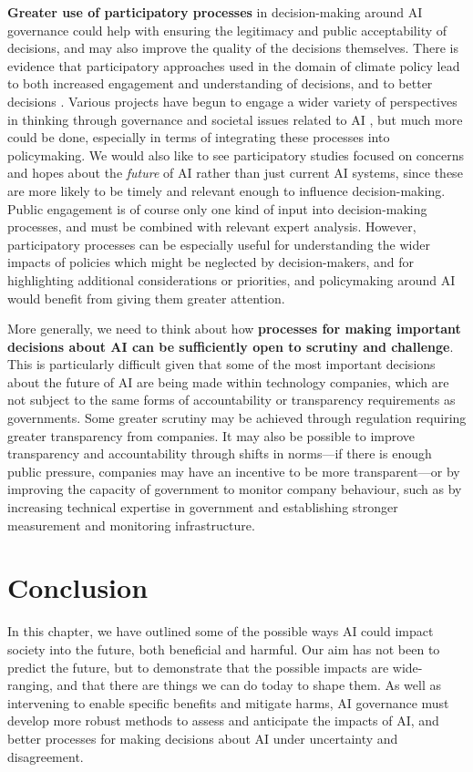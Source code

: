 \documentclass{article}
\begin{document}
\textbf{Greater use of participatory processes} in decision-making around AI governance could help with ensuring the legitimacy and public acceptability of decisions, and may also improve the quality of the decisions themselves. There is evidence that participatory approaches used in the domain of climate policy lead to both increased engagement and understanding of decisions, and to better decisions \citep{hugel_public_2020}. Various projects have begun to engage a wider variety of perspectives in thinking through governance and societal issues related to AI \citep{noauthor_public_2017, balaram_artificial_2018}, but much more could be done, especially in terms of integrating these processes into policymaking. We would also like to see participatory studies focused on concerns and hopes about the \textit{future} of AI rather than just current AI systems, since these are more likely to be timely and relevant enough to influence decision-making. Public engagement is of course only one kind of input into decision-making processes, and must be combined with relevant expert analysis. However, participatory processes can be especially useful for understanding the wider impacts of policies which might be neglected by decision-makers, and for highlighting additional considerations or priorities, and policymaking around AI would benefit from giving them greater attention.


More generally, we need to think about how \textbf{processes for making important decisions about AI can be sufficiently open to scrutiny and challenge}. This is particularly difficult given that some of the most important decisions about the future of AI are being made within technology companies, which are not subject to the same forms of accountability or transparency requirements as governments. Some greater scrutiny may be achieved through regulation requiring greater transparency from companies. It may also be possible to improve transparency and accountability through shifts in norms---if there is enough public pressure, companies may have an incentive to be more transparent---or by improving the capacity of government to monitor company behaviour, such as by increasing technical expertise in government and establishing stronger measurement and monitoring infrastructure. 

\section{Conclusion}

In this chapter, we have outlined some of the possible ways AI could impact society into the future, both beneficial and harmful. Our aim has not been to predict the future, but to demonstrate that the possible impacts are wide-ranging, and that there are things we can do today to shape them. As well as intervening to enable specific benefits and mitigate harms, AI governance must develop more robust methods to assess and anticipate the impacts of AI, and better processes for making decisions about AI under uncertainty and disagreement.
\newpage

\printbibliography[title={Bibliography}]
\end{document}
